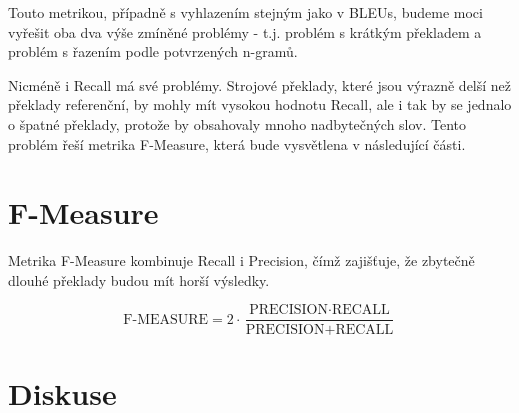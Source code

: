 Touto metrikou, případně s vyhlazením stejným jako v BLEUs,
  budeme moci vyřešit oba dva výše zmíněné problémy - 
  t.j. problém s krátkým překladem a problém s řazením podle potvrzených n-gramů.

Nicméně i Recall má své problémy.
Strojové překlady,
  které jsou výrazně delší než překlady referenční,
  by mohly mít vysokou hodnotu Recall,
  ale i tak by se jednalo o špatné překlady,
  protože by obsahovaly mnoho nadbytečných slov. 
Tento problém řeší metrika F-Measure,
  která bude vysvětlena v následující části.

\section{F-Measure}
Metrika F-Measure kombinuje Recall i Precision,
  čímž zajišťuje, 
  že zbytečně dlouhé překlady budou mít horší výsledky.

$$ \text{F-MEASURE} = 2 \cdot \frac{\text{PRECISION} \cdot \text{RECALL}}{\text{PRECISION} + \text{RECALL}} $$

\section{Diskuse}
